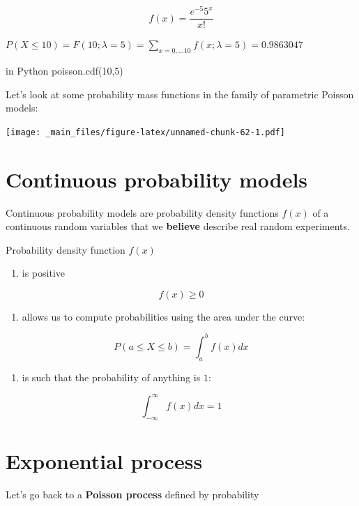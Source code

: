 \documentclass[
]{book}
\providecommand{\tightlist}{%
  \setlength{\itemsep}{0pt}\setlength{\parskip}{0pt}}
\begin{document}
\[f(x)= \frac{e^{-5}5^x}{x!}\]

\(P(X \leq 10)=F(10; \lambda=5)=\sum_{x=0, ...10}f(x; \lambda=5)=0.9863047\)

in Python poisson.cdf(10,5)

Let's look at some probability mass functions in the family of parametric Poisson models:

\texttt{[image: \_main\_files/figure-latex/unnamed-chunk-62-1.pdf]}

\hypertarget{continuous-probability-models}{%
\section{Continuous probability models}\label{continuous-probability-models}}

Continuous probability models are probability density functions \(f(x)\) of a continuous random variables that we \textbf{believe} describe real random experiments.

Probability density function \(f(x)\)

\begin{enumerate}
\def\labelenumi{\arabic{enumi})}
\tightlist
\item
  is positive
\end{enumerate}

\[f(x) \geq 0\]

\begin{enumerate}
\def\labelenumi{\arabic{enumi})}
\setcounter{enumi}{1}
\tightlist
\item
  allows us to compute probabilities using the area under the curve:
\end{enumerate}

\[P(a\leq X \leq b)=\int_{a}^{b} f(x) dx\]

\begin{enumerate}
\def\labelenumi{\arabic{enumi})}
\setcounter{enumi}{2}
\tightlist
\item
  is such that the probability of anything is \(1\):
\end{enumerate}

\[\int_{-\infty}^{\infty} f(x) dx = 1\]

\hypertarget{exponential-process}{%
\section{Exponential process}\label{exponential-process}}

Let's go back to a \textbf{Poisson process} defined by probability
\end{document}
